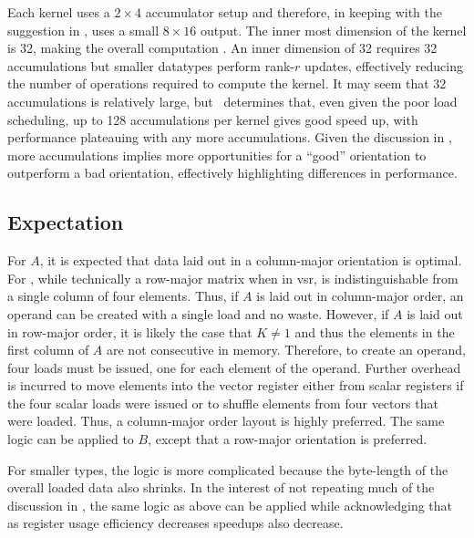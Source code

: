 \documentclass[\main/thesis.tex]{subfiles}
\begin{document}
Each kernel uses a $2 \times 4$ accumulator setup and therefore, in keeping with the suggestion in , uses a small $8 \times 16$ output.
The inner most dimension of the kernel is 32, making the overall computation .
An inner dimension of 32 requires 32 accumulations but smaller datatypes perform rank-$r$ updates, effectively reducing the number of operations required to compute the kernel.
It may seem that 32 accumulations is relatively large, but~\autocite{kuzma2021fast} determines that, even given the poor load scheduling, up to 128 accumulations per kernel gives good speed up, with performance plateauing with any more accumulations.
Given the discussion in , more accumulations implies more opportunities for a ``good'' orientation to outperform a bad orientation, effectively highlighting differences in performance.

\subsection{Expectation}
\label{sec:orderExpectation}
For $A$, it is expected that data laid out in a column-major orientation is optimal.
For , while technically a row-major matrix when in \gls{vsr}, is indistinguishable from a single column of four elements.
Thus, if $A$ is laid out in column-major order, an operand can be created with a single load and no waste.
However, if $A$ is laid out in row-major order, it is likely the case that $K \ne 1$ and thus the elements in the first column of $A$ are not consecutive in memory.
Therefore, to create an operand, four loads must be issued, one for each element of the operand.
Further overhead is incurred to move elements into the vector register either from scalar registers if the four scalar loads were issued or to shuffle elements from four vectors that were loaded.
Thus, a column-major order layout is highly preferred.
The same logic can be applied to $B$, except that a row-major orientation is preferred.

For smaller types, the logic is more complicated because the byte-length of the overall loaded data also shrinks.
In the interest of not repeating much of the discussion in , the same logic as above can be applied while acknowledging that as register usage efficiency decreases speedups also decrease.
\end{document}
